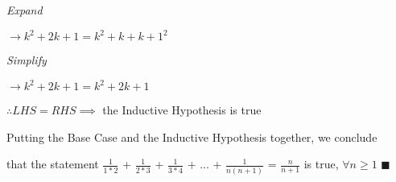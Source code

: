 \documentclass{report}
\begin{document}
    \textit{Expand}
    
    $\rightarrow k^{2} +2k + 1 = k^{2} +k +k +1^{2}$
    
    \textit{Simplify}
    
    $\rightarrow k^{2} +2k + 1 = k^{2} + 2k + 1$
    
    $\therefore LHS = RHS \implies$ the Inductive Hypothesis is true
    
    \bigskip
    
    Putting the Base Case and the Inductive Hypothesis together, we conclude 
    
    that the statement $\frac{1}{1*2}$ + $\frac{1}{2*3}$ + $\frac{1}{3*4}$ + ... + $\frac{1}{n(n+1)}$ = $\frac{n}{n+1}$ is true, $\forall n \geq 1$
    $\blacksquare$ 
    
    
\end{document}
